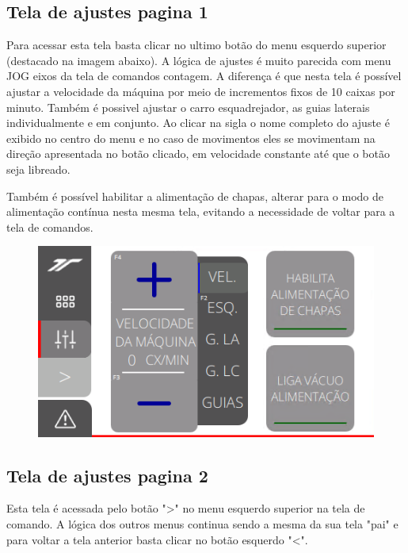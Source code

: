 \newpage
\thispagestyle{fancy}
\vspace*{40 pt}
\subsection{\small{Tela de ajustes pagina 1}}\label{ihmAlimentacaoTelaAjustesPagina1}

Para acessar esta tela basta clicar no ultimo botão do menu esquerdo superior (destacado na imagem abaixo). 
A lógica de ajustes é muito parecida com menu JOG eixos da tela de comandos contagem. A diferença é que nesta tela é possível ajustar a velocidade da máquina por meio
de incrementos fixos de 10 caixas por minuto. Também é possivel ajustar o carro esquadrejador, as guias laterais individualmente e em conjunto.
Ao clicar na sigla o nome completo do ajuste é exibido no centro do menu e no caso de movimentos eles se movimentam na direção apresentada no botão clicado,
em velocidade constante até que o botão seja libreado.

Também é possível habilitar a alimentação de chapas, alterar para o modo de alimentação contínua nesta mesma tela, evitando a necessidade de voltar para a tela de comandos.

\vspace*{\fill}
\begin{figure}[h]
  \centering
  \includegraphics{src/imagesFlexo/11-IHMALM/e-4.png}
\end{figure}
\vspace*{\fill}

\newpage
\thispagestyle{fancy}
\vspace*{40 pt}
\subsection{\small{Tela de ajustes pagina 2}}\label{telaAjustes2}
Esta tela é acessada pelo botão "\textgreater" no menu esquerdo superior na tela de comando. A lógica dos outros menus continua sendo a mesma da sua tela "pai" e para voltar a tela anterior basta clicar no botão esquerdo "\textless{}".

